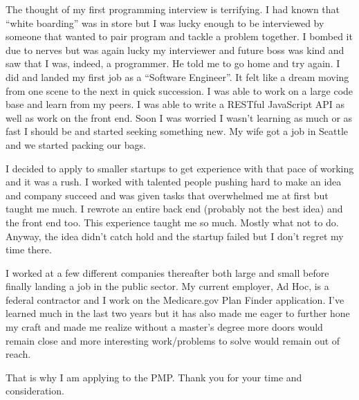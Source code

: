 \documentclass[12pt]{article}
\begin{document}
The thought of my first programming interview is terrifying. I had known that ``white boarding'' was in store but I was lucky enough to be interviewed by someone that wanted to pair program and tackle a problem together. I bombed it due to nerves but was again lucky my interviewer and future boss was kind and saw that I was, indeed, a programmer. He told me to go home and try again. I did and landed my first job as a ``Software Engineer''. It felt like a dream moving from one scene to the next in quick succession. I was able to work on a large code base and learn from my peers. I was able to write a RESTful JavaScript API as well as work on the front end. Soon I was worried I wasn't learning as much or as fast I should be and started seeking something new. My wife got a job in Seattle and we started packing our bags. 

I decided to apply to smaller startups to get experience with that pace of working and it was a rush. I worked with talented people pushing hard to make an idea and company succeed and was given tasks that overwhelmed me at first but taught me much. I rewrote an entire back end (probably not the best idea) and the front end too. This experience taught me so much. Mostly what not to do. Anyway, the idea didn't catch hold and the startup failed but I don't regret my time there.

I worked at a few different companies thereafter both large and small before finally landing a job in the public sector. My current employer, Ad Hoc, is a federal contractor and I work on the Medicare.gov Plan Finder application. I've learned much in the last two years but it has also made me eager to further hone my craft and made me realize without a master's degree more doors would remain close and more interesting work/problems to solve would remain out of reach.

That is why I am applying to the PMP. Thank you for your time and consideration.
\end{document}
